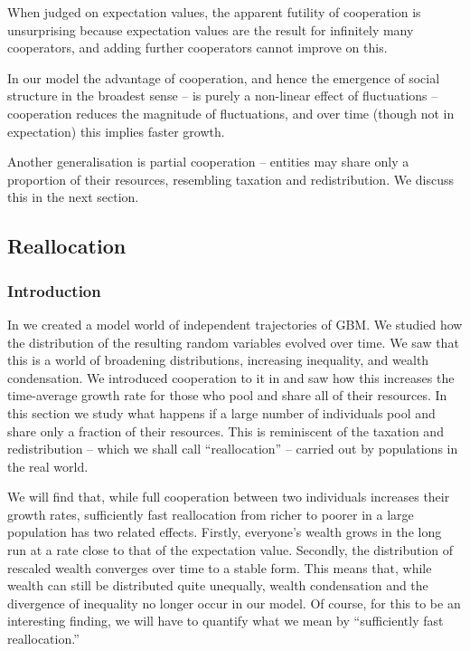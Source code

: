 When judged on expectation values, the apparent futility of cooperation is unsurprising
because expectation values are the result for infinitely 
many cooperators, and adding further cooperators cannot improve on this.

In our model the advantage of cooperation, and hence the emergence
of social structure in the broadest sense -- is purely a non-linear 
effect of fluctuations -- cooperation reduces the magnitude of 
fluctuations, and over time (though not in expectation) this implies faster growth. 


Another generalisation is partial cooperation -- entities may share only
a proportion of their resources, resembling taxation and redistribution. We discuss this in the next section.


\subsection{Reallocation}


\subsubsection{Introduction}

In  we created a model world of independent trajectories of GBM. We studied how the distribution of the resulting random variables evolved over time. We saw that this is a world of broadening distributions, increasing inequality, and wealth condensation. We introduced cooperation to it in  and saw how this increases the time-average growth rate for those who pool and share all of their resources. In this section we study what happens if a large number of individuals pool and share only a fraction of their resources. This is reminiscent of the taxation and redistribution -- which we shall call ``reallocation'' -- carried out by populations in the real world.

We will find that, while full cooperation between two individuals increases their growth rates, sufficiently fast reallocation from richer to poorer in a large population has two related effects. Firstly, everyone's wealth grows in the long run at a rate close to that of the expectation value. Secondly, the distribution of rescaled wealth converges over time to a stable form. This means that, while wealth can still be distributed quite unequally, wealth condensation and the divergence of inequality no longer occur in our model. Of course, for this to be an interesting finding, we will have to quantify what we mean by ``sufficiently fast reallocation.''

